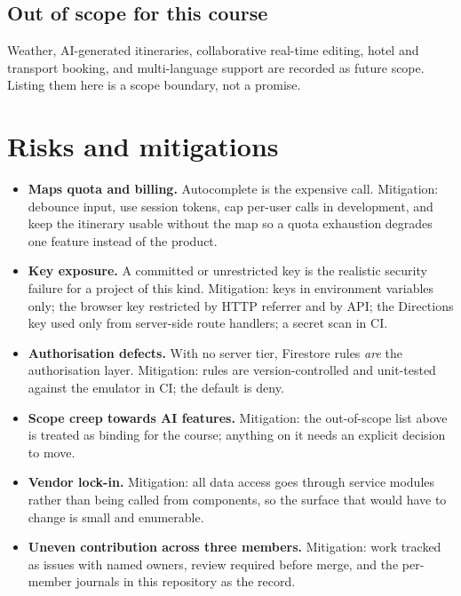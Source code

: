 \documentclass[11pt,a4paper]{article}
\begin{document}
\subsection{Out of scope for this course}
Weather, AI-generated itineraries, collaborative
real-time editing, hotel and transport booking, and
multi-language support are recorded as future scope.
Listing them here is a scope boundary, not a promise.

\section{Risks and mitigations}
\begin{itemize}[leftmargin=0.7cm]
    \item \textbf{Maps quota and billing.} Autocomplete
      is the expensive call. Mitigation: debounce
      input, use session tokens, cap per-user calls in
      development, and keep the itinerary usable
      without the map so a quota exhaustion degrades
      one feature instead of the product.
    \item \textbf{Key exposure.} A committed or
      unrestricted key is the realistic security
      failure for a project of this kind. Mitigation:
      keys in environment variables only; the browser
      key restricted by HTTP referrer and by API; the
      Directions key used only from server-side route
      handlers; a secret scan in CI.
    \item \textbf{Authorisation defects.} With no
      server tier, Firestore rules \emph{are} the
      authorisation layer. Mitigation: rules are
      version-controlled and unit-tested against the
      emulator in CI; the default is deny.
    \item \textbf{Scope creep towards AI features.}
      Mitigation: the out-of-scope list above is
      treated as binding for the course; anything on it
      needs an explicit decision to move.
    \item \textbf{Vendor lock-in.} Mitigation: all data
      access goes through service modules rather than
      being called from components, so the surface that
      would have to change is small and enumerable.
    \item \textbf{Uneven contribution across three
      members.} Mitigation: work tracked as issues with
      named owners, review required before merge, and
      the per-member journals in this repository as the
      record.
\end{itemize}
\end{document}
